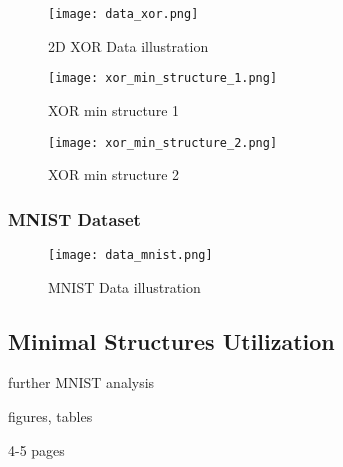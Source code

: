 \begin{figure}[H]
  \centering
  \texttt{[image: data\_xor.png]}
  \caption{2D XOR Data illustration}
  \label{img:data_xor}
\end{figure}

\begin{figure}[H]
  \centering
  \texttt{[image: xor\_min\_structure\_1.png]}
  \caption{XOR min structure 1}
  \label{img:xor_min_structure_1}
\end{figure}

\begin{figure}[H]
  \centering
  \texttt{[image: xor\_min\_structure\_2.png]}
  \caption{XOR min structure 2}
  \label{img:xor_min_structure_2}
\end{figure}

\subsubsection*{MNIST Dataset}

\begin{figure}[H]
  \centering
  \texttt{[image: data\_mnist.png]}
  \caption{MNIST Data illustration}
  \label{img:data_mnist}
\end{figure}

\subsection{Minimal Structures Utilization}
further MNIST analysis

figures, tables

4-5 pages